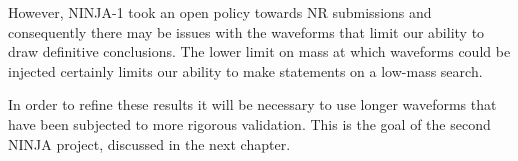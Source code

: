 However, NINJA-1 took an open policy towards NR submissions and
consequently there may be issues with the waveforms that limit our
ability to draw definitive conclusions.  The lower limit on mass at
which waveforms could be injected certainly limits our ability to make
statements on a low-mass search.

In order to refine these results it will be necessary to use longer
waveforms that have been subjected to more rigorous validation.  This
is the goal of the second NINJA project, discussed in the next
chapter.

